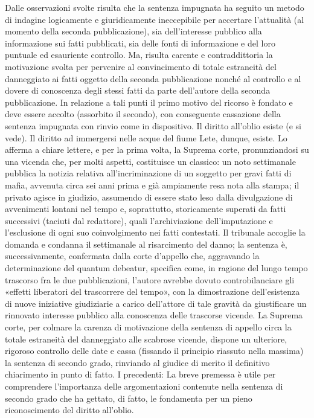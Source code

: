 Dalle osservazioni svolte risulta che la sentenza impugnata ha seguito un metodo di indagine logicamente e giuridicamente ineccepibile per accertare l’attualità (al momento della seconda pubblicazione), sia dell’interesse pubblico alla informazione sui fatti pubblicati, sia delle fonti di informazione e del loro puntuale ed esauriente controllo.
Ma, risulta carente e contraddittoria la motivazione svolta per pervenire al convincimento di totale estraneità del danneggiato ai fatti oggetto della seconda pubblicazione nonché al controllo e al dovere di conoscenza degli stessi fatti da parte dell’autore della seconda pubblicazione. In relazione a tali punti il primo motivo del ricorso è fondato e deve essere accolto (assorbito il secondo), con conseguente cassazione della sentenza impugnata con rinvio come in dispositivo.
Il diritto all’oblio esiste (e si vede).
Il diritto ad immergersi nelle acque del fiume Lete, dunque, esiste. Lo afferma a chiare lettere, e per la prima volta, la Suprema corte, pronunziandosi su una vicenda che, per molti aspetti, costituisce un classico: un noto settimanale pubblica la notizia relativa all’incriminazione di un soggetto per gravi fatti di mafia, avvenuta circa sei anni prima e già ampiamente resa nota alla stampa; il privato agisce in giudizio, assumendo di essere stato leso dalla divulgazione di avvenimenti lontani nel tempo e, soprattutto, storicamente superati da fatti successivi (taciuti dal redattore), quali l’archiviazione dell’imputazione e l’esclusione di ogni suo coinvolgimento nei fatti contestati.
Il tribunale accoglie la domanda e condanna il settimanale al risarcimento del danno; la sentenza è, successivamente, confermata dalla corte d’appello che, aggravando la determinazione del quantum debeatur, specifica come, in ragione del lungo tempo trascorso fra le due pubblicazioni, l’autore avrebbe dovuto controbilanciare gli «effetti liberatori del trascorrere del tempo», con la dimostrazione dell’esistenza di nuove iniziative giudiziarie a carico dell’attore di tale gravità da giustificare un rinnovato interesse pubblico alla conoscenza delle trascorse vicende.
La Suprema corte, per colmare la carenza di motivazione della sentenza di appello circa la totale estraneità del danneggiato alle scabrose vicende, dispone un ulteriore, rigoroso controllo delle date e cassa (fissando il principio riassuto nella massima) la sentenza di secondo grado, rinviando al giudice di merito il definitivo chiarimento in punto di fatto.
I precedenti: La breve premessa è utile per comprendere l’importanza delle argomentazioni contenute nella sentenza di secondo grado che ha gettato, di fatto, le fondamenta per un pieno riconoscimento del diritto all’oblio.
